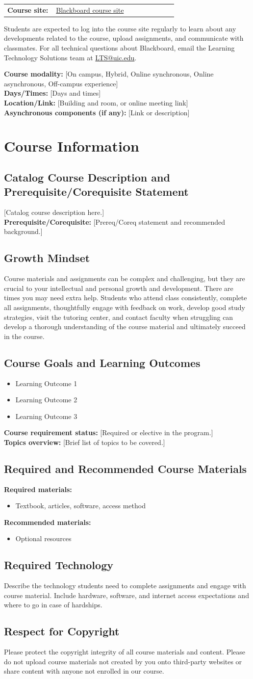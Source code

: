 \documentclass[11pt]{article}
\newcommand{\blackboardLinkText}{Blackboard course site}
\newcommand{\blackboardLinkUrl}{https://blackboard.uic.edu}
\newcommand{\courseModalitySchedule}{%
\textbf{Course modality:} [On campus, Hybrid, Online synchronous, Online asynchronous, Off-campus experience] \\
\textbf{Days/Times:} [Days and times] \\
\textbf{Location/Link:} [Building and room, or online meeting link] \\
\textbf{Asynchronous components (if any):} [Link or description]
}
\newcommand{\catalogDescription}{%
[Catalog course description here.] \\
\textbf{Prerequisite/Corequisite:} [Prereq/Coreq statement and recommended background.]
}
\newcommand{\growthMindsetStatement}{%
Course materials and assignments can be complex and challenging, but they are crucial
to your intellectual and personal growth and development. There are times you may need
extra help. Students who attend class consistently, complete all assignments, thoughtfully
engage with feedback on work, develop good study strategies, visit the tutoring center,
and contact faculty when struggling can develop a thorough understanding of the course
material and ultimately succeed in the course.
}
\newcommand{\courseGoalsLearningOutcomes}{%
\begin{itemize}
  \item Learning Outcome 1
  \item Learning Outcome 2
  \item Learning Outcome 3
\end{itemize}

\textbf{Course requirement status:} [Required or elective in the program.]\\
\textbf{Topics overview:} [Brief list of topics to be covered.]
}
\newcommand{\courseMaterials}{%
\textbf{Required materials:}
\begin{itemize}
  \item Textbook, articles, software, access method
\end{itemize}
\textbf{Recommended materials:}
\begin{itemize}
  \item Optional resources
\end{itemize}
}
\newcommand{\requiredTechnology}{%
Describe the technology students need to complete assignments and engage with course material.
Include hardware, software, and internet access expectations and where to go in case of hardships.
}
\newcommand{\copyrightStatement}{%
Please protect the copyright integrity of all course materials and content.
Please do not upload course materials not created by you onto third-party websites
or share content with anyone not enrolled in our course.
}
\begin{document}
\noindent
\begin{tabular}{@{}p{0.28\linewidth}p{0.70\linewidth}@{}}
\textbf{Course site:} & \href{\blackboardLinkUrl}{\blackboardLinkText} \\
\end{tabular}

Students are expected to log into the course site regularly to learn about any developments related to the course,
upload assignments, and communicate with classmates. For all technical questions about Blackboard, email the Learning
Technology Solutions team at \href{mailto:LTS@uic.edu}{LTS@uic.edu}.

\courseModalitySchedule

\section*{Course Information}

\subsection*{Catalog Course Description and Prerequisite/Corequisite Statement}
\catalogDescription

\subsection*{Growth Mindset}
\growthMindsetStatement

\subsection*{Course Goals and Learning Outcomes}
\courseGoalsLearningOutcomes

\subsection*{Required and Recommended Course Materials}
\courseMaterials

\subsection*{Required Technology}
\requiredTechnology

\subsection*{Respect for Copyright}
\copyrightStatement
\end{document}

